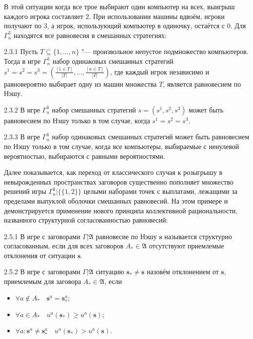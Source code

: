 В этой ситуации когда все трое выбирают один компьютер на всех, выигрыш каждого игрока составляет $2$. При использовании машины вдвоём, игроки получают по $3$, а игрок, использующий компьютер в одиночку, остаётся с $0$. Для $\Gamma^3_n$ находятся все равновесия в смешанных стратегиях:
\begin{lemma}{2.3.1}
	Пусть $T \subseteq \{1, \ldots, n\}$ "--- произвольное непустое подмножество компьютеров. Тогда в игре $\Gamma^3_n$ набор одинаковых смешанных стратегий $s^1 = s^2 = s^3 = \left(\frac{[1 \in T]}{\left| T \right|}, \ldots, \frac{[n \in T]}{\left| T \right|}\right)$, где каждый игрок независимо и равновероятно выбирает одну из машин множества $T$, является равновесием по Нэшу.
\end{lemma}

\begin{lemma}{2.3.2}
	В игре $\Gamma^3_n$ набор смешанных стратегий $s = (s^1, s^2, s^3)$ может быть равновесием по Нэшу только в том случае, когда $s^1 = s^2 = s^3$.
\end{lemma}

\begin{lemma}{2.3.3}
	В игре $\Gamma^3_n$ набор одинаковых смешанных стратегий может быть равновесием по Нэшу только в том случае, когда все компьютеры, выбираемые с ненулевой вероятностью, выбираются с равными вероятностями.
\end{lemma}

Далее показывается, как переход от классического случая к розыгрышу в невырожденных пространствах заговоров существенно пополняет множество решений игры $\Gamma^3_n | \{\{1,2\}\}$ целыми наборами точек с выплатами, лежащими за пределами выпуклой оболочки смешанных равновесий. На этом примере и демонстрируется применение нового принципа коллективной рациональности, названного структурной согласованностью равновесий:
\begin{definition}{2.5.1}
	В игре с заговорами $\Gamma | \mathfrak{A}$ равновесие по Нэшу $\mathbf{s}$ называется структурно согласованным, если для всех заговоров $A_* \in \mathfrak{A}$ отсутствуют приемлемые отклонения от ситуации $\mathbf{s}$.
\end{definition}

\begin{definition}{2.5.2}
	В игре с заговорами $\Gamma | \mathfrak{A}$ ситуацию $\mathbf{s}_* \neq \mathbf{s}$ назовём отклонением от $\mathbf{s}$, приемлемым для заговора $A_* \in \mathfrak{A}$, если
	\begin{itemize}
		\item $\forall a \notin A_* \quad \mathbf{s}^a = \mathbf{s}_*^a$;
		\item $\forall a \in A_* \quad u^a(\mathbf{s}_*) \geq u^a(\mathbf{s})$;
		\item $\forall a : \mathbf{s}^a \neq \mathbf{s}_*^a \quad u^a(\mathbf{s}_*) > u^a(\mathbf{s})$.
	\end{itemize}
\end{definition}

